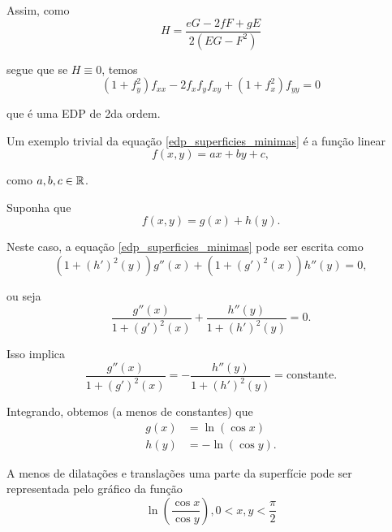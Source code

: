 \begin{exemplo}
	Assim, como
	\begin{equation*}
		H = \frac{eG - 2fF + gE}{2(EG - F^2)}
	\end{equation*}
	
	segue que se $H \equiv 0$, temos
	\begin{equation}\label{edp_superficies_minimas}
		(1 + f_y^2) f_{xx}  - 2 f_x f_y f_{xy} + (1+f_x^2) f_{yy} = 0
	\end{equation}
	
	que é uma EDP de 2da ordem.
	
	Um exemplo trivial da equação \ref{edp_superficies_minimas} é a função linear
	\begin{equation*}
		f(x,y) = ax + by + c,
	\end{equation*}
	
	como $a, b, c \in \mathbb{R}$.
\end{exemplo}

\begin{exemplo}
	Suponha que
	\begin{equation*}
		f(x,y) = g(x) + h(y).
	\end{equation*}
	
	Neste caso, a equação \ref{edp_superficies_minimas} pode ser escrita como
	\begin{equation*}
		(1 + (h')^2(y)) g''(x) + (1 + (g')^2(x)) h''(y) = 0,
	\end{equation*}
	
	ou seja
	\begin{equation*}
		\frac{g''(x)}{1 + (g')^2(x)} + \frac{h''(y)}{1 + (h')^2(y)} = 0.
	\end{equation*}
	
	Isso implica
	\begin{equation*}
		\frac{g''(x)}{1 + (g')^2(x)} = - \frac{h''(y)}{1 + (h')^2(y)} = \text{constante}.
	\end{equation*}
	
	Integrando, obtemos (a menos de constantes) que
	\begin{align*}
		g(x) &= \ln (\cos x)\\
		h(y) &= -\ln (\cos y).
	\end{align*}
	
	A menos de dilatações e translações uma parte da superfície pode ser representada pelo gráfico da função
	\begin{equation*}
		\ln \left( \frac{\cos x}{\cos y} \right), 0 < x,y < \frac{\pi}{2}
	\end{equation*}
\end{exemplo}

